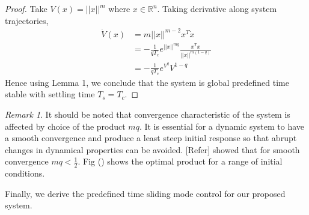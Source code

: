 \documentclass[]{article}
\theoremstyle{remark}
\newtheorem{remark}{Remark}
\theoremstyle{definition}
\begin{document}
\begin{proof}
	Take $ V(x) = ||x||^m $ where $ x\in \mathbb{R}^n $.
	Taking derivative along system trajectories,
\begin{align}
\dot V(x) &= m||x||^{m-2}x^T\dot x \\
& = -\frac{1}{qT_c}e^{||x||^{mq}}\frac{{x^T}x}{||x||^{m(1-q)}} \\
& = -\frac{1}{qT_c}e^{V^q}V^{1-q}
\end{align}
Hence using Lemma 1, we conclude that the system is global predefined time stable with settling time $ T_s = T_c $.
\end{proof}
\begin{remark}
It should be noted that convergence characteristic of the system is affected by choice of the product $ mq $. It is essential for a dynamic system to have a smooth convergence and produce a least steep initial response so that abrupt changes in dynamical properties can be avoided. [Refer] showed that for smooth convergence $ mq < \frac{1}{2} $. Fig ()  shows the optimal product for a range of initial conditions. 
\end{remark}
Finally, we derive the predefined time sliding mode control for our proposed system.
\end{document}
